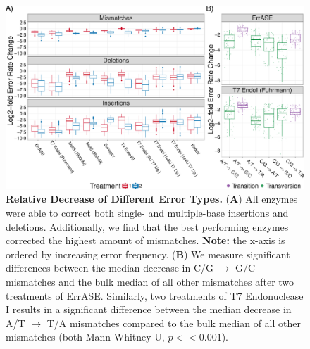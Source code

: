 \documentclass[letterpaper,12pt]{article}
\begin{document}
\clearpage
\begin{figure}[t]
\centering
\includegraphics[width=174mm]{Figure_4-1.pdf}
\caption{\small \textbf{Relative Decrease of Different Error Types.} (\textbf{A}) All enzymes were able to correct both single- and multiple-base insertions and deletions. Additionally, we find that the best performing enzymes corrected the highest amount of mismatches. \textbf{Note:} the x-axis is ordered by increasing error frequency. (\textbf{B}) We measure significant differences between the median decrease in C/G $\to$ G/C mismatches and the bulk median of all other mismatches after two treatments of ErrASE. Similarly, two treatments of T7 Endonuclease I results in a significant difference between the median decrease in A/T $\to$ T/A mismatches compared to the bulk median of all other mismatches (both Mann-Whitney U, $p << 0.001$). }
\label{fig:allTreats}
\end{figure}

\end{document}
